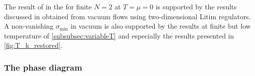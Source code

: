 	The result of \ssb{} in the \ir{} for finite $N=2$ at $T=\mu=0$ is supported by the results discussed in \gnAppVacFlow{} obtained from vacuum flows using two-dimensional Litim regulators. A non-vanishing $\sigma_\mathrm{min}$ in vacuum is also supported by the results at finite but low temperature of \cref{subsubsec:variableT} and especially the results presented in \cref{fig:T_k_restored}.\clearpage

\subsubsection{The phase diagram}\label{subsubsec:PDfiniteN}
	{\hspace{\subcaptionFigureSpacing}}%
